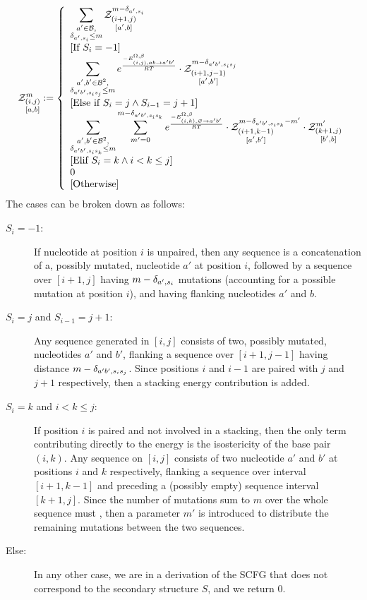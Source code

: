 \begin{equation}
\label{eq:Z_rec}
	\Z{i,j}{m}{a,b}:=\left\{
  \begin{array}{l}
  		\displaystyle
      \sum_{\substack{a'\in \B,\\ \Kron_{a',s_i}\le m}}  
      \Z{i+1,j}{m-\Kron_{a',s_i}}{a',b} \\
       \text{[If }S_{i}=-1\text{]}\\
      \displaystyle
      \sum_{\substack{a',b'\in \B^2,\\ \Kron_{a'b',s_is_j}\le m}}
			 e^{\frac{-E_{(i,j),ab \to a'b'}^{\Omega,\beta}}{RT}}
			 \cdot \Z{i+1,j-1}{m-\Kron_{a'b',s_is_j}}{a',b'}\\
			 \text{[Else if }S_i=j \land S_{i-1}=j+1\text{]}\\
			 \displaystyle
      \sum_{\substack{a',b'\in \B^2,\\ \Kron_{a'b',s_is_k}\le m}}
      \sum_{m'=0}^{m-\Kron_{a'b',s_is_k}}
   		 e^{\frac{-E_{(i,k),\varnothing\to a'b'}^{\Omega,\beta}}{RT}}
      \cdot\Z{i+1,k-1}{m-\Kron_{a'b',s_is_k}-m'}{a',b'}
      \cdot\Z{k+1,j}{m'}{b',b} \\
       \text{[Elif }S_i=k \land i < k \leq j\text{]}\\
      0 \\\text{[Otherwise]}
	\end{array}\right.
\end{equation}
The cases can be broken down as follows:
\begin{description}
\item[$S_{i}=-1$:] If nucleotide at position $i$ is unpaired, then 
any sequence is a concatenation of a, possibly mutated, nucleotide $a'$ at position  $i$, 
followed by a sequence over $[i+1,j]$ having $m-\delta_{a',s_i}$ mutations (accounting for a possible mutation 
at position $i$), and having flanking nucleotides $a'$ and $b$.
\item[$S_i=j$ and $S_{i-1}=j+1$:] Any sequence generated in $[i,j]$ consists of two, possibly mutated, nucleotides $a'$ and $b'$, flanking a sequence over $[i+1,j-1]$ having distance $m-\delta_{a'b',s_is_j}$.
Since positions $i$ and $i-1$ are paired with $j$ and $j+1$ respectively, 
then a stacking energy contribution is added. 
\item[$S_i=k$ and $i<k \leq j$:] If position $i$ is paired and not involved in a stacking, then the 
only term contributing directly to the energy is the isostericity of the base pair $(i,k)$. 
Any sequence on $[i,j]$ consists of two nucleotide $a'$ and $b'$ at positions $i$ and $k$ respectively, flanking a sequence over interval $[i+1,k-1]$ and preceding a (possibly empty) sequence interval $[k+1,j]$. Since the number of mutations sum to $m$ over the whole sequence must , then a parameter $m'$ is introduced to distribute the remaining mutations between the two sequences.
\item[Else:] In any other case, we are in a derivation of the SCFG that does not correspond to the secondary structure $S$, and we return $0$.
\end{description}

